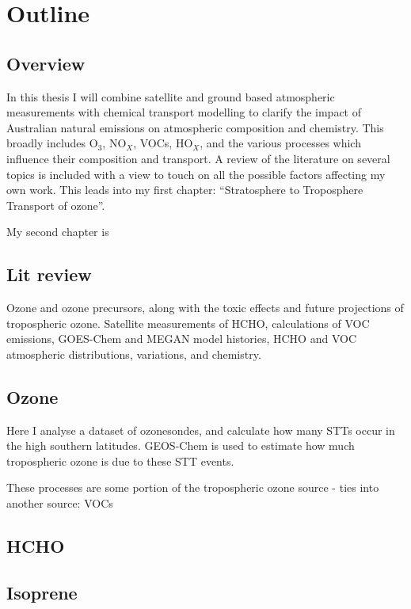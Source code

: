 \chapter{Outline}

  \section{Overview}
    In this thesis I will combine satellite and ground based atmospheric measurements with chemical transport modelling to clarify the impact of Australian natural emissions on atmospheric composition and chemistry.
    This broadly includes O$_3$, NO$_X$, VOCs, HO$_X$, and the various processes which influence their composition and transport.
    A review of the literature on several topics is included with a view to touch on all the possible factors affecting my own work.
    This leads into my first chapter: ``Stratosphere to Troposphere Transport of ozone''.
    
    My second chapter is 
  \section{Lit review}
    Ozone and ozone precursors, along with the toxic effects and future projections of tropospheric ozone.
    Satellite measurements of HCHO, calculations of VOC emissions, GOES-Chem and MEGAN model histories, HCHO and VOC atmospheric distributions, variations, and chemistry.
  
  \section{Ozone}
      Here I analyse a dataset of ozonesondes, and calculate how many STTs occur in the high southern latitudes.
      GEOS-Chem is used to estimate how much tropospheric ozone is due to these STT events.
      
      These processes are some portion of the tropospheric ozone source - ties into another source: VOCs
  \section{HCHO}
      
  \section{Isoprene}